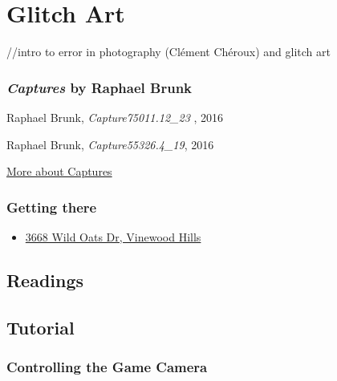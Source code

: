 \documentclass[
  openany]{book}
\providecommand{\tightlist}{%
  \setlength{\itemsep}{0pt}\setlength{\parskip}{0pt}}
\begin{document}
\hypertarget{glitch-art}{%
\chapter{Glitch Art}\label{glitch-art}}

//intro to error in photography (Clément Chéroux) and glitch art

\hypertarget{captures-by-raphael-brunk}{%
\subsection*{\texorpdfstring{\emph{Captures} by Raphael Brunk}{Captures by Raphael Brunk}}\label{captures-by-raphael-brunk}}

Raphael Brunk, \emph{Capture75011.12\_23 }, 2016

Raphael Brunk, \emph{Capture55326.4\_19}, 2016

\href{http://www.darktaxa-project.net/artists/raphael-brunk/}{More about Captures}

\hypertarget{getting-there-9}{%
\subsection*{Getting there}\label{getting-there-9}}

\begin{itemize}
\tightlist
\item
  \href{https://grandtheftdata.com/landmarks/\#-94.207,530.818,5,atlas,name=3668,3668_Wild_Oats_Dr,_Vinewood_Hills}{3668 Wild Oats Dr, Vinewood Hills}
\end{itemize}

\hypertarget{readings-6}{%
\section*{Readings}\label{readings-6}}

\hypertarget{tutorial-6}{%
\section*{Tutorial}\label{tutorial-6}}

\hypertarget{controlling-the-game-camera}{%
\subsection*{Controlling the Game Camera}\label{controlling-the-game-camera}}
\end{document}
